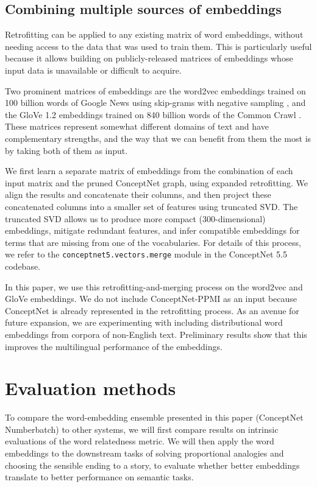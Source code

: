 \documentclass[letterpaper]{article}
\begin{document}
\subsection{Combining multiple sources of embeddings}

Retrofitting can be applied to any existing matrix of word embeddings, without
needing access to the data that was used to train them. This is particularly
useful because it allows building on publicly-released matrices of embeddings
whose input data is unavailable or difficult to acquire.

Two prominent matrices of embeddings are the word2vec embeddings trained on 100
billion words of Google News using skip-grams with negative sampling
\cite{mikolov2013word2vec}, and the GloVe 1.2 embeddings trained on 840 billion
words of the Common Crawl \cite{pennington2014glove}. These matrices represent
somewhat different domains of text and have complementary strengths, and the
way that we can benefit from them the most is by taking both of them as input.

We first learn a separate matrix of embeddings from the combination of each
input matrix and the pruned ConceptNet graph, using expanded retrofitting. We
align the results and concatenate their columns, and then project these
concatenated columns into a smaller set of features using truncated SVD. The
truncated SVD allows us to produce more compact (300-dimensional) embeddings,
mitigate redundant features, and infer compatible embeddings for terms that
are missing from one of the vocabularies. For details of this process, we
refer to the \texttt{conceptnet5.vectors.merge} module in the ConceptNet 5.5
codebase.

In this paper, we use this retrofitting-and-merging process on the
word2vec and GloVe embeddings. We do not include ConceptNet-PPMI as an input
because ConceptNet is already represented in the retrofitting process. As an
avenue for future expansion, we are experimenting with including distributional
word embeddings from corpora of non-English text. Preliminary results show that
this improves the multilingual performance of the embeddings.

\section{Evaluation methods}

To compare the word-embedding ensemble presented in this paper (ConceptNet
Numberbatch) to other systems, we will first compare results on intrinsic
evaluations of the word relatedness metric. We will then apply the word
embeddings to the downstream tasks of solving proportional analogies and
choosing the sensible ending to a story, to evaluate whether better embeddings
translate to better performance on semantic tasks.
\end{document}
